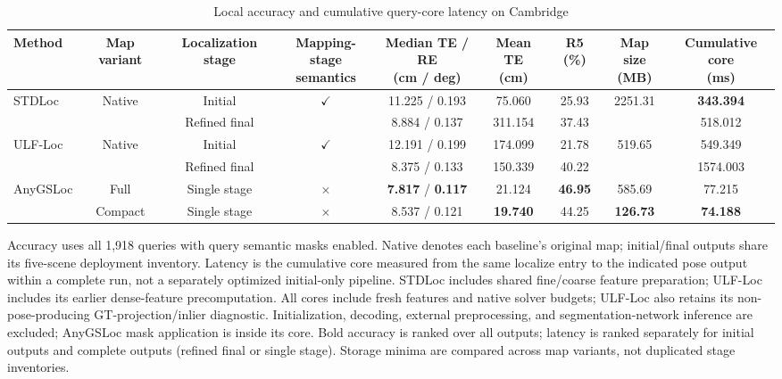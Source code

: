 \begin{table}[tp]
\centering
\footnotesize
\setlength{\tabcolsep}{4pt}
\renewcommand{\arraystretch}{1.12}
\caption{Local accuracy and cumulative query-core latency on Cambridge}
\label{tab:t4}
\begin{tabular}{lcccccccc}
\toprule
Method & Map variant & Localization stage & \shortstack{Mapping-stage\\semantics} & \shortstack{Median TE / RE\\(cm / deg)} & \shortstack{Mean TE\\(cm)} & R5 (\%) & \shortstack{Map size\\(MB)} & \shortstack{Cumulative core\\(ms)} \\
\midrule
\multirow{2}{*}{STDLoc} & \multirow{2}{*}{Native} & Initial & \multirow{2}{*}{$\checkmark$} & 11.225 / 0.193 & 75.060 & 25.93 & \multirow{2}{*}{2251.31} & \textbf{343.394} \\
 &  & Refined final &  & 8.884 / 0.137 & 311.154 & 37.43 &  & 518.012 \\
\multirow{2}{*}{ULF-Loc} & \multirow{2}{*}{Native} & Initial & \multirow{2}{*}{$\checkmark$} & 12.191 / 0.199 & 174.099 & 21.78 & \multirow{2}{*}{519.65} & 549.349 \\
 &  & Refined final &  & 8.375 / 0.133 & 150.339 & 40.22 &  & 1574.003 \\
\multirow{2}{*}{AnyGSLoc} & Full & Single stage & $\times$ & \textbf{7.817} / \textbf{0.117} & 21.124 & \textbf{46.95} & 585.69 & 77.215 \\
 & Compact & Single stage & $\times$ & 8.537 / 0.121 & \textbf{19.740} & 44.25 & \textbf{126.73} & \textbf{74.188} \\
\bottomrule
\end{tabular}
\par\smallskip\begin{minipage}{0.98\linewidth}\footnotesize Accuracy uses all 1,918 queries with query semantic masks enabled. Native denotes each baseline's original map; initial/final outputs share its five-scene deployment inventory. Latency is the cumulative core measured from the same localize entry to the indicated pose output within a complete run, not a separately optimized initial-only pipeline. STDLoc includes shared fine/coarse feature preparation; ULF-Loc includes its earlier dense-feature precomputation. All cores include fresh features and native solver budgets; ULF-Loc also retains its non-pose-producing GT-projection/inlier diagnostic. Initialization, decoding, external preprocessing, and segmentation-network inference are excluded; AnyGSLoc mask application is inside its core. Bold accuracy is ranked over all outputs; latency is ranked separately for initial outputs and complete outputs (refined final or single stage). Storage minima are compared across map variants, not duplicated stage inventories.\end{minipage}
\end{table}

